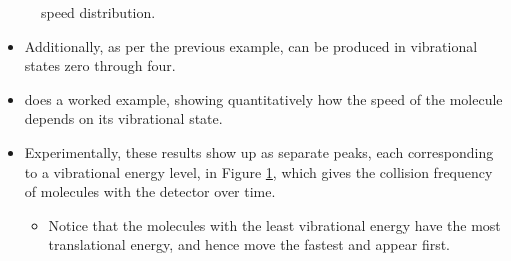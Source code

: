 \documentclass[../notes.tex]{subfiles}
\begin{document}
\begin{itemize}
\begin{figure}[h!]
        \caption{ speed distribution.}
        \label{fig:DFspeeds}
    \end{figure}
    \begin{itemize}
        \item Additionally, as per the previous example,  can be produced in vibrational states zero through four.
        \item \textcite{bib:McQuarrieSimon} does a worked example, showing quantitatively how the speed of the  molecule depends on its vibrational state.
        \item Experimentally, these results show up as separate peaks, each corresponding to a vibrational energy level, in Figure \ref{fig:DFspeeds}, which gives the collision frequency of  molecules with the detector over time.
        \begin{itemize}
            \item Notice that the molecules with the least vibrational energy have the most translational energy, and hence move the fastest and appear first.
        \end{itemize}
    \end{itemize}
\end{itemize}
\end{document}
